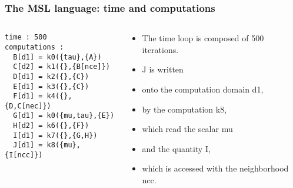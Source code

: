 \documentclass{beamer}
\begin{document}
\begin{frame}[fragile]
\frametitle{The MSL language: time and computations}
\begin{columns}
\begin{column}{6cm}
\begin{lstlisting}[frame=single]
time : 500
computations :
  B[d1] = k0({tau},{A})
  C[d2] = k1({},{B[nce]})
  D[d1] = k2({},{C})
  E[d1] = k3({},{C})
  F[d1] = k4({},{D,C[nec]})
  G[d1] = k0({mu,tau},{E})
  H[d2] = k6({},{F})
  I[d1] = k7({},{G,H})
  J[d1] = k8({mu},{I[ncc]})
\end{lstlisting}
\end{column}
\begin{column}{5cm}
\begin{itemize}
\item The time loop is composed of 500 iterations.
\item J is written
\item onto the computation domain d1,
\item by the computation k8,
\item which read the scalar mu
\item and the quantity I,
\item which is accessed with the neighborhood ncc.
\end{itemize}
\end{column}
\end{columns}
\end{frame}


\end{document}
